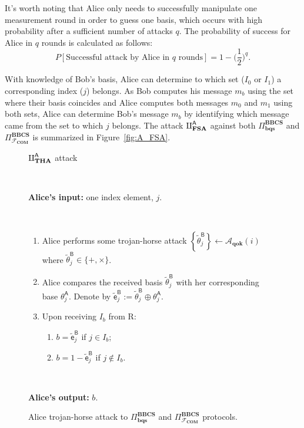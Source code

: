 It's worth noting that Alice only needs to successfully manipulate one measurement round in order to guess one basis, which occurs with high probability after a sufficient number of attacks $q$. The probability of success for Alice in $q$ rounds is calculated as follows: 
$$P[\text{Successful attack by Alice in }q\text{ rounds} ] = 1 - \bigg(\frac{1}{2}\bigg)^q.$$

With knowledge of Bob's basis, Alice can determine to which set ($I_0$ or $I_1$) a corresponding index ($j$) belongs. As Bob computes his message $m_b$ using the set where their basis coincides and Alice computes both messages $m_0$ and $m_1$ using both sets, Alice can determine Bob's message $m_b$ by identifying which message came from the set to which $j$ belongs. The attack $\rotPi^{\mathsf{A}}_{\textbf{FSA}}$ against both $\Pi^{\textbf{BBCS}}_{\textbf{bqs}}$ and $\Pi^{\textbf{BBCS}}_{\mathcal{F}_\textbf{COM}}$ is summarized in Figure~\ref{fig:A_FSA}.


\begin{figure}[h!]
    \centering
        \begin{tcolorbox}
            
            \centerline{$\rotPi^{\mathsf{A}}_{\textbf{THA}}$ attack}
            
            \
            
            \textbf{Alice's input:}  one index element, $j$.
            
            \
            
            \begin{enumerate}
         \item Alice performs some trojan-horse attack $\left\{\tilde{\theta}^{\mathsf{B}}_{j}\right\} \leftarrow \mathcal{A}_{\textbf{qok}}(i) $ where $\tilde{\theta}^{\mathsf{B}}_{j}\in\{+, \times\}$.
         \item Alice compares the received basis $\tilde{\theta}^{\mathsf{B}}_{j}$ with her corresponding base $\theta^{\mathsf{A}}_{j}$. Denote by $\tilde{\mathsf{e}}^{\mathsf{B}}_j := \tilde{\theta}^{\mathsf{B}}_{j} \oplus \theta^{\mathsf{A}}_{j}$. 
         \item Upon receiving $I_b$ from R:
         \begin{enumerate}
             \item $b=\tilde{\mathsf{e}}^{\mathsf{B}}_j$ if $j\in I_b$;
             \item $b=1-\tilde{\mathsf{e}}^{\mathsf{B}}_j$ if $j\notin I_b$.
         \end{enumerate}
         
    \end{enumerate}    
            
            \
            
        \textbf{Alice's output:} $b$.

        
        \end{tcolorbox}
    \caption{Alice trojan-horse attack to $\Pi^{\textbf{BBCS}}_{\textbf{bqs}}$ and $\Pi^{\textbf{BBCS}}_{\mathcal{F}_\textbf{COM}}$ protocols.}
    \label{fig:A_THA}
\end{figure}


